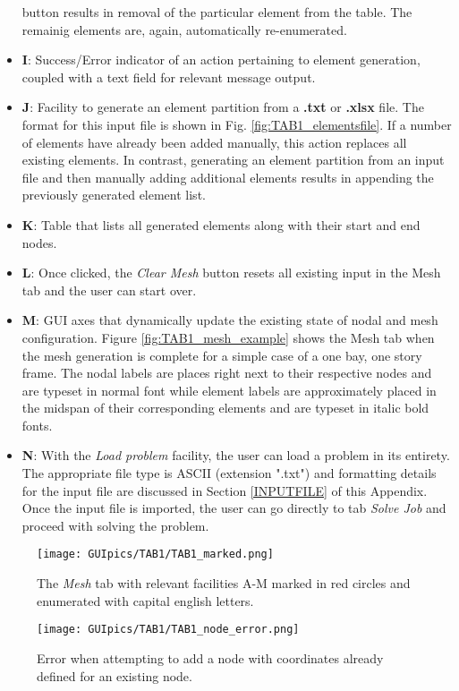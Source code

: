 \begin{itemize}
	button results in removal of the particular element from the table. The 
	remainig elements are, again, automatically re-enumerated.
	\item \textbf{I}: Success/Error indicator of an action pertaining to 
	element generation, coupled with a text field for relevant message output.
	\item \textbf{J}: Facility to generate an element partition from a 
	\textbf{.txt} or \textbf{.xlsx} file. The format for this input file is 
	shown in Fig. \ref{fig:TAB1_elementsfile}. If a number of elements have 
	already been added manually, this action replaces all existing elements. In 
	contrast, generating an element partition from an input file and then 
	manually adding additional elements results in appending the previously 
	generated element list.
	\item \textbf{K}:  Table that lists all generated elements along with their 
	start and end nodes.
	\item \textbf{L}: Once clicked, the \textit{Clear Mesh} button resets all 
	existing input in the Mesh tab and the user can start over.
	\item \textbf{M}: GUI axes that dynamically update the existing state of 
	nodal and mesh configuration. Figure \ref{fig:TAB1_mesh_example} shows the 
	Mesh tab when the mesh generation is complete for a simple case of a one 
	bay, one story frame. The nodal labels are places right next to their 
	respective nodes and are typeset in normal font while element labels are 
	approximately placed in the midspan of their corresponding elements and are 
	typeset in italic bold fonts.
	\item \textbf{N}: With the \textit{Load problem} facility, the user can 
	load a problem in its entirety. The appropriate file type is ASCII 
	(extension ".txt") and formatting details for the input file are discussed 
	in Section \ref{INPUTFILE} of this Appendix. Once the input file is 
	imported, the user 
	can go directly to tab \textit{Solve Job} and proceed with solving the 
	problem.
\end{itemize}

\begin{figure}
	\centering
	\texttt{[image: GUIpics/TAB1/TAB1\_marked.png]}
	\caption{The \textit{Mesh} tab with relevant facilities A-M marked in red 
	circles 
	and enumerated with capital english letters.}
	\label{fig:TAB1_marked}
\end{figure}

\begin{figure}
	\centering
	\texttt{[image: GUIpics/TAB1/TAB1\_node\_error.png]}
	\caption{Error when attempting to add a node with coordinates already 
	defined for an existing node.}
	\label{fig:TAB1_node_error}
\end{figure}

